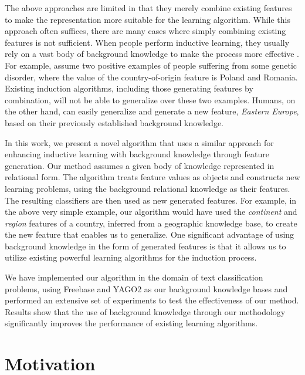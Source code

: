 \documentclass[letterpaper]{article} %
\theoremstyle{definition}
\begin{document}
The above approaches are limited in that they merely combine existing features to make the representation more suitable for the 
learning algorithm.  While this approach often suffices, there are many cases where simply combining existing features is not sufficient.
When people perform inductive learning, they usually rely on a vast body of background knowledge to make the process more
effective \cite{mcnamara1996learning}. For example, assume two positive examples of people suffering from some genetic disorder, where the 
value of the country-of-origin feature is Poland and Romania.  Existing induction algorithms, including those generating features 
by combination, will not be able to generalize over these two examples.  Humans, on the other hand, can easily generalize 
and generate a new feature, \emph{Eastern Europe}, based
on their previously established background knowledge.

In this work, we present a novel algorithm that uses a similar approach for enhancing inductive learning with background knowledge through feature generation.
Our method assumes a given body of knowledge represented in relational form.  The algorithm treats feature values as objects and constructs new learning problems, using the background relational knowledge as their features.  The resulting classifiers are then used as new generated features.
For example, in the above very simple example, our algorithm would have used the \emph{continent} and \emph{region} features of a country,
inferred from a geographic knowledge base, to create the new feature that enables us to generalize.  One significant advantage of
using background knowledge in the form of generated features is that it allows us to utilize existing powerful learning algorithms for the induction process.

We have implemented our algorithm in the domain of text classification problems, using Freebase and YAGO2 as our background knowledge bases 
and performed an extensive set of experiments to test the effectiveness of our method.  Results show that the use of background knowledge through our methodology significantly improves the performance of existing learning algorithms.

\section{Motivation} \label{motivation}
\end{document}
